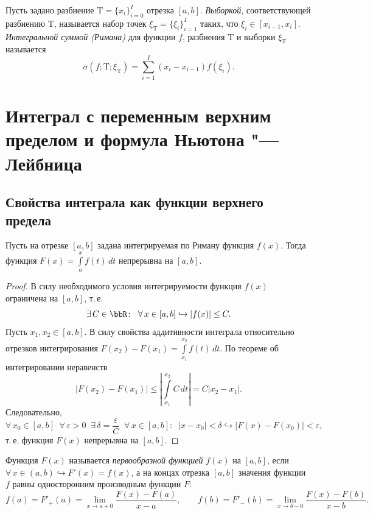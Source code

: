 \begin{defn}
Пусть задано разбиение $\mathrm{T} = \{x_i\}_{i=0}^I$ отрезка $[a, b]$. \textit{Выборкой}, соответствующей разбиению $\mathrm{T}$, называется набор точек $\xi_{\mathrm{T}} = \{\xi_i\}_{i=1}^I$ таких, что $\xi_i \in [x_{i-1}, x_i]$. \textit{Интегральной суммой (Римана)} для функции $f$, разбиения $\mathrm{T}$ и выборки $\xi_{\mathrm{T}}$ называется
$$
\sigma(f; \mathrm{T}; \xi_{\mathrm{T}}) = \sum_{i=1}^I (x_i - x_{i-1})f(\xi_i).
$$
\end{defn}


\section{Интеграл с переменным верхним пределом и формула Ньютона "--- Лейбница}

\subsection{Свойства интеграла как функции верхнего предела}

\begin{thm} \label{th:int_cont}
Пусть на отрезке $[a, b]$ задана интегрируемая по Риману функция $f(x)$. Тогда функция $F(x) = \int\limits_a^x f(t)\,dt$ непрерывна на $[a, b]$.
\end{thm}

\begin{proof}
В силу необходимого условия интегрируемости функция $f(x)$ ограничена на $[a, b]$, т.\,е.
$$
\exists\, C \in \bbR \colon \;\; \forall\, x \in [a, b] \hookrightarrow |f(x)| \le C.
$$
Пусть $x_1, x_2 \in [a, b]$. В силу свойства аддитивности интеграла относительно отрезков интегрирования $F(x_2) - F(x_1) = \int\limits_{x_1}^{x_2} f(t)\,dt$. По теореме об интегрировании неравенств
$$
|F(x_2) - F(x_1)| \le \left| \int\limits_{x_1}^{x_2} C\,dt \right| = C|x_2 - x_1|.
$$
Следовательно,
$$
\forall\, x_0 \in [a, b] \;\; \forall\, \varepsilon > 0 \;\; \exists\, \delta = \frac{\varepsilon}{C} \;\; \forall\, x \in [a, b] \colon \;\; |x - x_0| < \delta \hookrightarrow |F(x) - F(x_0)| < \varepsilon,
$$
т.\,е. функция $F(x)$ непрерывна на $[a, b]$.
\end{proof}

\begin{defn}
Функция $F(x)$ называется \textit{первообразной функцией} $f(x)$ на $[a, b]$, если $\forall\, x \in (a, b) \hookrightarrow F'(x) = f(x)$, а на концах отрезка $[a, b]$ значения функции $f$ равны односторонним производным функции $F$:
$$
f(a) = F'_+(a) = \lim_{x \to a+0} \frac{F(x) - F(a)}{x - a}, \qquad f(b) = F'_-(b) = \lim_{x \to b-0} \frac{F(x) - F(b)}{x - b}.
$$
\end{defn}

